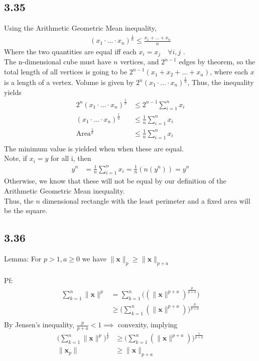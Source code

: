 \documentclass[letterpaper,12pt]{article}
\theoremstyle{definition}
\begin{document}
\subsection*{3.35}
Using the Arithmetic Geometric Mean inequality,
\begin{align*}
    (x_1 \cdot ... \cdot x_n)^{\frac{1}{n}} \leq \frac{x_1+\dots+x_n}{n}
\end{align*}
Where the two quantities are equal iff each $x_i = x_j \quad \forall i,j$ .\\
The n-dimensional cube must have $n$ vertices, and $2^{n-1}$ edges by theorem, so the total length of all vertices is going to be $2^{n-1}(x_1+x_2+\dots+x_n)$, where each $x$ is a length of a vertex.
Volume is given by $2^n(x_1\cdot \dots \cdot x_n)^{\frac{1}{n}}$, Thus, the inequality yields
\begin{align*}
    2^{n}(x_1\cdot ... \cdot x_n)^{\frac{1}{n}} & \leq 2^{n-1} \sum_{i=1}^n x_i\\
    (x_1\cdot ... \cdot x_n)^{\frac{1}{n}} & \leq \frac{1}{n}\sum_{i=1}^n x_i\\
    \text{Area}^{\frac{1}{n}} & \leq \frac{1}{n}\sum_{i=1}^n x_i \\
\end{align*}
The minimum value is yielded when when these are equal.\\
Note, if $x_i = y$ for all i, then 
\begin{align*}
    y^n & = \frac{1}{n}\sum_{i=1}^n x_i = \frac{1}{n} (n(y^n)) = y^n
\end{align*}
Otherwise, we know that these will not be equal by our definition of the Arithmetic Geometric Mean inequality.\\
Thus, the $n$ dimensional rectangle with the least perimeter and a fixed area will be the square.

\subsection*{3.36}
Lemma: For $p > 1, a \geq 0$ we have $\|\mathbf{x}\|_p \geq \|\mathbf{x}\|_{p+a}$\\\\
Pf:\\
\begin{align*}
    \sum_{k=1}^{n} \|\mathbf{x}\|^p &= \sum_{k=1}^{n} \big( (\|\mathbf{x}\|^{p+a})^{\frac{p}{p+a}} \big) \\
    & \geq \big( \sum_{k=1}^{n}  (\|\mathbf{x}\|^{p+a}) \big)^{\frac{p}{p+a}} \\
\end{align*}
By Jensen's inequality, $\frac{p}{p+a} < 1 \implies $ convexity, implying 
\begin{align*}
    \big( \sum_{k=1}^{n} \|\mathbf{x}\|^p\big)^{\frac{1}{p}} &\geq \big( \sum_{k=1}^{n}  (\|\mathbf{x}\|^{p+a}) \big)^{\frac{1}{p+a}} \\
    \|\mathbf{x}_p \| & \geq \|\mathbf{x}\|_{p+a}
\end{align*}
\end{document}
